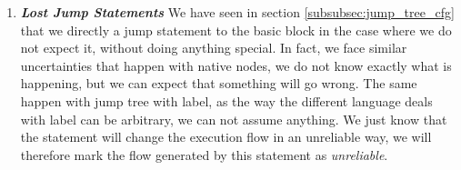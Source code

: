 \begin{enumerate}
	\item \textbf{\textit{Lost Jump Statements}} \newline 
	\label{subsubsec:lost_jump_statement}
	We have seen in section \ref{subsubsec:jump_tree_cfg} that we directly a jump statement to the basic block in the case where we do not expect it, without doing anything special.
	In fact, we face similar uncertainties that happen with native nodes, we do not know exactly what is happening, but we can expect that something will go wrong.
	The same happen with jump tree with label, as the way the different language deals with label can be arbitrary, we can not assume anything.
	We just know that the statement will change the execution flow in an unreliable way, we will therefore mark the flow generated by this statement as \emph{unreliable}.
\end{enumerate}
